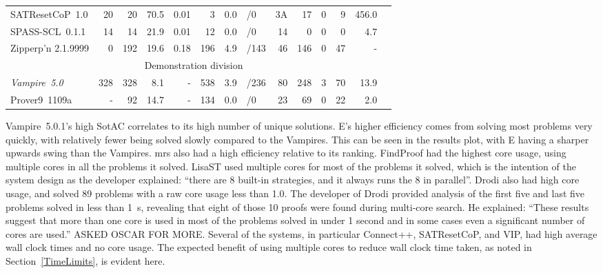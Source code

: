 \documentclass[aic]{iosart2x}
\begin{document}
\begin{table}[tbh]
\begin{tabular}{lrrrrrr@{}l@{}rrrrrr}
SATResetCoP~1.0        &   20  &   20   & 70.5 & 0.01 &   3     & 0.0       & {\tiny /0  } &   3A &  17 &   0 &   9 &456.0  \\
SPASS-SCL~0.1.1        &   14  &   14   & 21.9 & 0.01 &  12     & 0.0       & {\tiny /0  } &   14 &   0 &   0 &   0 &  4.7  \\
Zipperp'n 2.1.9999     &    0  &  192   & 19.6 & 0.18 & 196     & 4.9       & {\tiny /143} &   46 & 146 &   0 &  47 &    -  \\
\hline
\multicolumn{13}{c}{Demonstration division} \\
\hline
\textit{Vampire~5.0}   &  328  &  328   &  8.1 &    - & 538     & 3.9       & {\tiny /236} &   80 & 248 &   3 &  70 & 13.9  \\
Prover9~1109a          &    -  &   92   & 14.7 &    - & 134     & 0.0       & {\tiny /0  } &   23 &  69 &   0 &  22 &  2.0  \\
\hline
\end{tabular}
\end{table}

Vampire~5.0.1's high SotAC correlates to its high number of unique solutions.
E's higher efficiency comes from solving most problems very quickly, with relatively fewer being 
solved slowly compared to the Vampires.
This can be seen in the results plot, with E having a sharper upwards swing than the Vampires.
mrs also had a high efficiency relative to its ranking.
FindProof had the highest core usage, using multiple cores in all the problems it solved.
LisaST used multiple cores for most of the problems it solved, which is the intention of
the system design as the developer explained: ``there are 8 built-in strategies, and it 
always runs the 8 in parallel''.
Drodi also had high core usage, and solved 89 problems with a raw core usage less than 1.0.
The developer of Drodi provided analysis of the first five and last five problems solved in 
less than 1~s, revealing that eight of those 10 proofs were found during multi-core search.
He explained: ``These results suggest that more than one core is used in most of the problems 
solved in under 1 second and in some cases even a significant number of cores are used.''
ASKED OSCAR FOR MORE.
Several of the systems, in particular Connect++, SATResetCoP, and VIP, had high average wall 
clock times and no core usage.
The expected benefit of using multiple cores to reduce wall clock time taken, as noted in
Section~\ref{TimeLimits}, is evident here.
\end{document}
